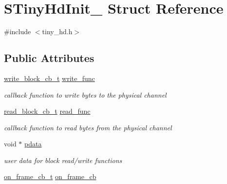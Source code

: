 \hypertarget{structSTinyHdInit__}{}\section{S\+Tiny\+Hd\+Init\+\_\+ Struct Reference}
\label{structSTinyHdInit__}


{\ttfamily \#include $<$tiny\+\_\+hd.\+h$>$}

\subsection*{Public Attributes}
\begin{DoxyCompactItemize}
\item 
\mbox{\label{structSTinyHdInit___a0bd05a4fc43236ff37d67aec4d2a0952}} 
\hyperlink{tiny__types_8h_aafd634660bba76cace57a8f9b01e044d}{write\+\_\+block\+\_\+cb\+\_\+t} \hyperlink{structSTinyHdInit___a0bd05a4fc43236ff37d67aec4d2a0952}{write\+\_\+func}
\begin{DoxyCompactList}\small\item\em callback function to write bytes to the physical channel \end{DoxyCompactList}\item 
\mbox{\label{structSTinyHdInit___a5de352b11ca7915737bc459cde7c566d}} 
\hyperlink{tiny__types_8h_a15bec127d9ee63658563d62e92b5261b}{read\+\_\+block\+\_\+cb\+\_\+t} \hyperlink{structSTinyHdInit___a5de352b11ca7915737bc459cde7c566d}{read\+\_\+func}
\begin{DoxyCompactList}\small\item\em callback function to read bytes from the physical channel \end{DoxyCompactList}\item 
\mbox{\label{structSTinyHdInit___a7b6be4e09ea04eaa4372eadce4d51055}} 
void $\ast$ \hyperlink{structSTinyHdInit___a7b6be4e09ea04eaa4372eadce4d51055}{pdata}
\begin{DoxyCompactList}\small\item\em user data for block read/write functions \end{DoxyCompactList}\item 
\mbox{\label{structSTinyHdInit___ae2eea5181620dfbb47b60a5073bd5ed2}} 
\hyperlink{tiny__types_8h_ad6bf709565b8aecb9e6ecf196f219d54}{on\+\_\+frame\+\_\+cb\+\_\+t} \hyperlink{structSTinyHdInit___ae2eea5181620dfbb47b60a5073bd5ed2}{on\+\_\+frame\+\_\+cb}

\end{DoxyCompactItemize}
